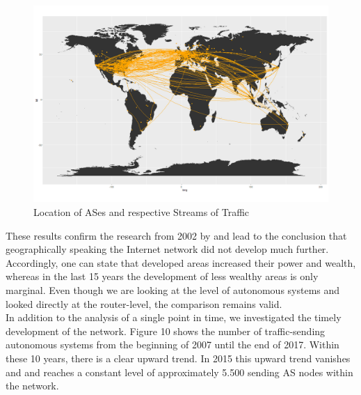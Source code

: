 \documentclass[conference, 11pt]{IEEEtran}
\begin{document}
\vspace{0.5cm}
\begin{figure}[h]
\centerline{\includegraphics[width=\columnwidth]{Graphics/connectedASes.png}}
\caption{Location of ASes and respective Streams of Traffic}
\label{fig}
\end{figure}
\vspace{0.5cm}


These results confirm the research from 2002 by \cite{geoResearch} and lead to the conclusion that geographically speaking the Internet network did not develop much further. Accordingly, one can state that developed areas increased their power and wealth, whereas in the last 15 years the development of less wealthy areas is only marginal. Even though we are looking at the level of autonomous systems and \cite{geoResearch} looked directly at the router-level, the comparison remains valid. \\


In addition to the analysis of a single point in time, we investigated the timely development of the network. Figure 10 shows the number of traffic-sending autonomous systems from the beginning of 2007 until the end of 2017. Within these 10 years, there is a clear upward trend. In 2015 this upward trend vanishes and and reaches a constant level of approximately 5.500 sending AS nodes within the network. \\
\end{document}
